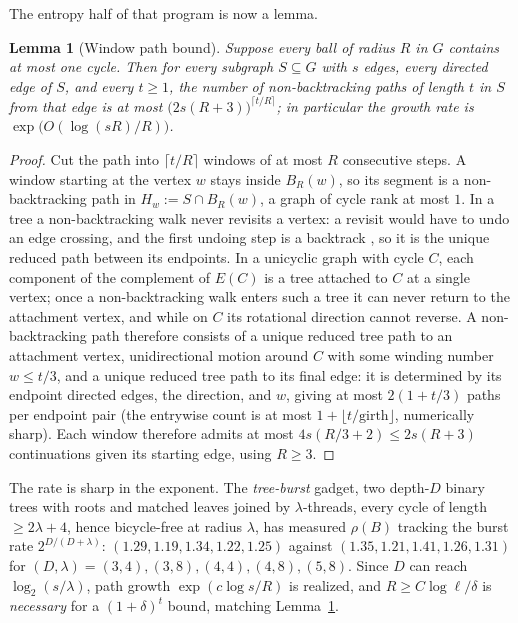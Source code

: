 \documentclass[11pt]{article}
\newtheorem{lemma}{Lemma}
\theoremstyle{remark}
\begin{document}
The entropy half of that program is now a lemma.

\begin{lemma}[Window path bound]\label{lem:window}
Suppose every ball of radius $R$ in $G$ contains at most one cycle.
Then for every subgraph $S\subseteq G$ with $s$ edges, every directed
edge of $S$, and every $t\ge1$, the number of non-backtracking paths
of length $t$ in $S$ from that edge is at most
$\big(2s(R+3)\big)^{\lceil t/R\rceil}$; in particular the growth rate
is $\exp\!\big(O(\log(sR)/R)\big)$.
\end{lemma}

\begin{proof}
Cut the path into $\lceil t/R\rceil$ windows of at most $R$
consecutive steps. A window starting at the vertex $w$ stays inside
$B_R(w)$, so its segment is a non-backtracking path in
$H_w:=S\cap B_R(w)$, a graph of cycle rank at most $1$. In a tree a
non-backtracking walk never revisits a vertex: a revisit would have
to undo an edge crossing, and the first undoing step is a backtrack
, so it is the unique reduced path between its endpoints. In a
unicyclic graph with cycle $C$, each component of the complement of
$E(C)$ is a tree attached to $C$ at a single vertex; once a
non-backtracking walk enters such a tree it can never return to the
attachment vertex, and while on $C$ its rotational direction cannot
reverse. A non-backtracking path therefore consists of a unique
reduced tree path to an attachment vertex, unidirectional motion
around $C$ with some winding number $w\le t/3$, and a unique reduced
tree path to its final edge: it is determined by its endpoint directed
edges, the direction, and $w$, giving at most $2(1+t/3)$ paths per
endpoint pair (the entrywise count is at most $1+\lfloor t/\mathrm{girth}\rfloor$, numerically sharp). Each
window therefore admits at most $4s(R/3+2)\le2s(R+3)$
continuations given its starting edge, using $R\ge3$.
\end{proof}

The rate is sharp in the exponent. The \emph{tree-burst} gadget, 
two depth-$D$ binary trees with roots and matched leaves joined by
$\lambda$-threads, every cycle of length $\ge2\lambda+4$, hence
bicycle-free at radius $\lambda$, has measured $\rho(B)$ tracking
the burst rate $2^{D/(D+\lambda)}$: $(1.29,1.19,1.34,1.22,1.25)$
against $(1.35,1.21,1.41,1.26,1.31)$ for
$(D,\lambda)=(3,4),(3,8),(4,4),(4,8),(5,8)$. Since $D$ can reach
$\log_2(s/\lambda)$, path growth $\exp(c\log s/R)$ is realized, and
$R\ge C\log\ell/\delta$ is \emph{necessary} for a $(1+\delta)^t$
bound, matching Lemma~\ref{lem:window}.
\end{document}

